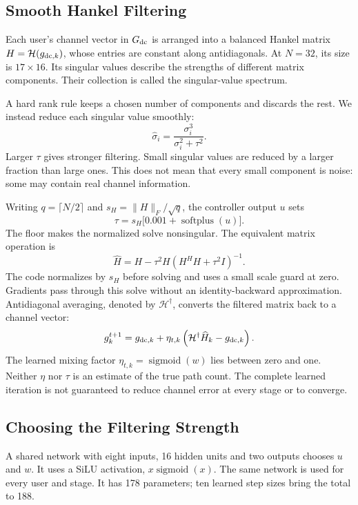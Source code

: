 \documentclass[journal]{IEEEtran}
\newcommand{\Hank}{\mathcal{H}}
\DeclareMathOperator{\sigmoid}{sigmoid}
\DeclareMathOperator{\softplus}{softplus}
\begin{document}
\subsection{Smooth Hankel Filtering}
Each user's channel vector in $G_{\rm dc}$ is arranged into a balanced
Hankel matrix $H=\Hank(g_{{\rm dc},k})$, whose entries are constant along
antidiagonals. At $N=32$, its size is $17\times16$. Its singular values
describe the strengths of different matrix components. Their collection
is called the singular-value spectrum.

A hard rank rule keeps a chosen number of components and discards the
rest. We instead reduce each singular value smoothly:
\begin{equation}
 \widehat\sigma_i=\frac{\sigma_i^3}{\sigma_i^2+\tau^2}.
 \label{eq:shrink}
\end{equation}
Larger $\tau$ gives stronger filtering. Small singular values are reduced
by a larger fraction than large ones. This does not mean that every small
component is noise: some may contain real channel information.

Writing $q=\lceil N/2\rceil$ and
$s_H=\|H\|_F/\sqrt q$, the controller output $u$ sets
\begin{equation}
 \tau=s_H\bigl[0.001+\softplus(u)\bigr].
\end{equation}
The floor makes the normalized solve nonsingular. The equivalent matrix
operation is
\begin{equation}
 \widehat H=H-\tau^2H(H^HH+\tau^2I)^{-1}.
\end{equation}
The code normalizes by $s_H$ before solving and uses a small scale guard
at zero. Gradients pass through this solve without an identity-backward
approximation. Antidiagonal averaging, denoted by $\Hank^\dagger$, converts
the filtered matrix back to a channel vector:
\begin{equation}
 g_k^{t+1}=g_{{\rm dc},k}+\eta_{t,k}
 \left(\Hank^\dagger\widehat H_k-g_{{\rm dc},k}\right).
\end{equation}
The learned mixing factor $\eta_{t,k}=\sigmoid(w)$ lies between zero and
one. Neither $\eta$ nor $\tau$ is an estimate of the true path count.
The complete learned iteration is not guaranteed to reduce channel error
at every stage or to converge.

\subsection{Choosing the Filtering Strength}
A shared network with eight inputs, 16 hidden units and two outputs
chooses $u$ and $w$. It uses a SiLU activation, $x\sigmoid(x)$. The same
network is used for every user and stage. It has 178 parameters; ten
learned step sizes bring the total to 188.
\end{document}

